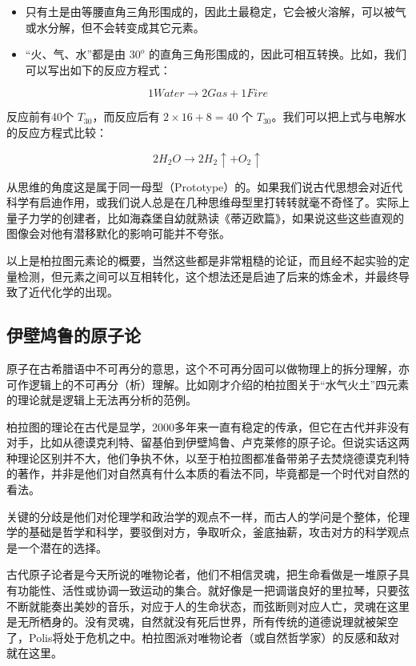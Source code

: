 \begin{itemize}
\item 只有土是由等腰直角三角形围成的，因此土最稳定，它会被火溶解，可以被气或水分解，但不会转变成其它元素。

\item “火、气、水”都是由 $30^o$ 的直角三角形围成的，因此可相互转换。比如，我们可以写出如下的反应方程式：
\end{itemize}

\begin{equation}
1 Water \to 2 Gas + 1 Fire 
\end{equation}

反应前有40个 $T_{30}$，而反应后有 $2 \times 16 + 8 = 40$ 个 $T_{30}$。我们可以把上式与电解水的反应方程式比较：

\begin{equation}
2 H_2 O \to 2 H_2 \uparrow + O_2 \uparrow
\end{equation}

从思维的角度这是属于同一母型（Prototype）的。如果我们说古代思想会对近代科学有启迪作用，或我们说人总是在几种思维母型里打转转就毫不奇怪了。实际上量子力学的创建者，比如海森堡自幼就熟读《蒂迈欧篇》，如果说这些这些直观的图像会对他有潜移默化的影响可能并不夸张。

以上是柏拉图元素论的概要，当然这些都是非常粗糙的论证，而且经不起实验的定量检测，但元素之间可以互相转化，这个想法还是启迪了后来的炼金术，并最终导致了近代化学的出现。

\subsection{伊壁鸠鲁的原子论}

原子在古希腊语中不可再分的意思，这个不可再分固可以做物理上的拆分理解，亦可作逻辑上的不可再分（析）理解。比如刚才介绍的柏拉图关于“水气火土”四元素的理论就是逻辑上无法再分析的范例。

柏拉图的理论在古代是显学，2000多年来一直有稳定的传承，但它在古代并非没有对手，比如从德谟克利特、留基伯到伊壁鸠鲁、卢克莱修的原子论。但说实话这两种理论区别并不大，他们争执不休，以至于柏拉图都准备带弟子去焚烧德谟克利特的著作，并非是他们对自然真有什么本质的看法不同，毕竟都是一个时代对自然的看法。

关键的分歧是他们对伦理学和政治学的观点不一样，而古人的学问是个整体，伦理学的基础是哲学和科学，要驳倒对方，争取听众，釜底抽薪，攻击对方的科学观点是一个潜在的选择。

古代原子论者是今天所说的唯物论者，他们不相信灵魂，把生命看做是一堆原子具有功能性、活性或协调一致运动的集合。就好像是一把调谐良好的里拉琴，只要弦不断就能奏出美妙的音乐，对应于人的生命状态，而弦断则对应人亡，灵魂在这里是无所栖身的。没有灵魂，自然就没有死后世界，所有传统的道德说理就被架空了，Polis将处于危机之中。柏拉图派对唯物论者（或自然哲学家）的反感和敌对就在这里。

